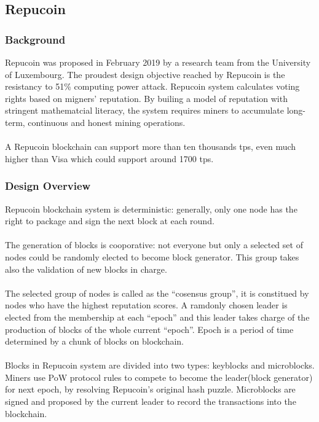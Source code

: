 \documentclass[]{article}
\begin{document}
\begin{CJK*}{UTF8}{gbsn}
	\subsection{Repucoin} 
	\subsubsection*{Background} 
	Repucoin was proposed in February 2019 by a research team from the University of Luxembourg. The proudest design objective reached by Repucoin is the resistancy to 51\% computing power attack. Repucoin system calculates voting rights based on migners' reputation. By builing a model of reputation with stringent mathematcial literacy, the system requires miners to accumulate long-term, continuous and honest mining operations.
	\paragraph{}
	A Repucoin blockchain can support more than ten thousands tps, even much higher than Visa which could support around 1700 tps.
	\subsubsection*{Design Overview}
	Repucoin blockchain system is deterministic: generally, only one node has the right to package and sign the next block at each round. 
	\paragraph{}
	The generation of blocks is cooporative: not everyone but only a selected set of nodes could be randomly elected to become block generator. This group takes also the validation of new blocks in charge.
	\paragraph{}
	The selected group of nodes is called as the ``cosensus group'', it is constitued by nodes who have the highest reputation scores. A ramdonly chosen leader is elected from the membership at each ``epoch'' and this leader takes charge of the production of blocks of the whole current ``epoch''. Epoch is a period of time determined by a chunk of blocks on blockchain.
	\paragraph{}
	Blocks in Repucoin system are divided into two types: keyblocks and microblocks. Miners use PoW protocol rules to compete to become the leader(block generator) for next epoch, by resolving Repucoin's original hash puzzle. Microblocks are signed and proposed by the current leader to record the transactions into the blockchain.

\end{CJK*}
\end{document}
